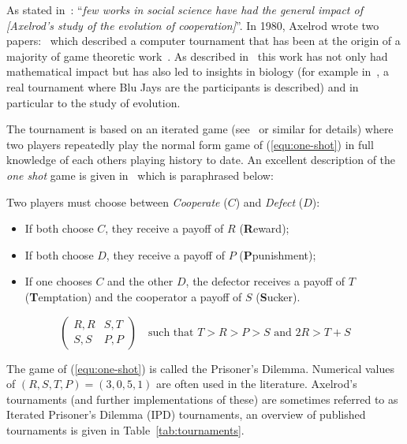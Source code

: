 \documentclass{article}
\begin{document}
As stated in~\cite{Bendor1991}: ``\textit{few works in social science have had
the general impact of [Axelrod's study of the evolution of cooperation]}''.  In
1980, Axelrod wrote two papers:~\cite{Axelrod1980a,Axelrod1980b} which
described a computer tournament that has been at the origin of a majority of
game theoretic work~\cite{Banks1990, Bendor1991, Boyd1987, Chellapilla1999,
DavidB1993, Doebeli2005, Ellison1994, Gotts2003, Hilbe2013, Isaac2008,
Kraines1989, Lee2015, Lorberbaum1994, Milgrom1982, Molander1985, Murnighan2015,
Press2012, Stephens2002, Stewart2012}. As described in~\cite{Bendor1991} this
work has not only had mathematical impact but has also led to insights in
biology (for example in~\cite{Stephens2002}, a real tournament where Blu Jays
are the participants is described) and in particular to the study of evolution.

The tournament is based on an iterated game (see~\cite{Maschler2013} or similar
for details) where two players repeatedly play the normal form game of
(\ref{equ:one-shot}) in full knowledge of each others playing history to date.
An excellent description of the \textit{one shot} game is given
in~\cite{Gotts2003} which is paraphrased below:

Two players must choose between \textit{Cooperate} (\(C\)) and \textit{Defect}
(\(D\)):

\begin{itemize}
    \item If both choose \(C\), they receive a payoff of \(R\)
        (\textbf{R}eward);
    \item If both choose \(D\), they receive a payoff of \(P\)
        (\textbf{P}punishment);
    \item If one chooses \(C\) and the other \(D\), the defector receives a
        payoff of \(T\) (\textbf{T}emptation) and the cooperator a payoff of
        \(S\) (\textbf{S}ucker).
\end{itemize}

\begin{equation}
    \begin{pmatrix}
        R,R & S,T\\
        S,S & P,P
    \end{pmatrix}\quad\text{such that } T>R>P>S \text{ and } 2R > T + S
    \label{equ:one-shot}
\end{equation}

The game of (\ref{equ:one-shot}) is called the Prisoner's Dilemma. Numerical
values of \((R,S,T,P)=(3,0,5,1)\) are often used in the literature. Axelrod's
tournaments (and further implementations of these) are sometimes referred to as
Iterated Prisoner's Dilemma (IPD) tournaments, an overview of published tournaments is
given in Table~\ref{tab:tournaments}.
\end{document}

